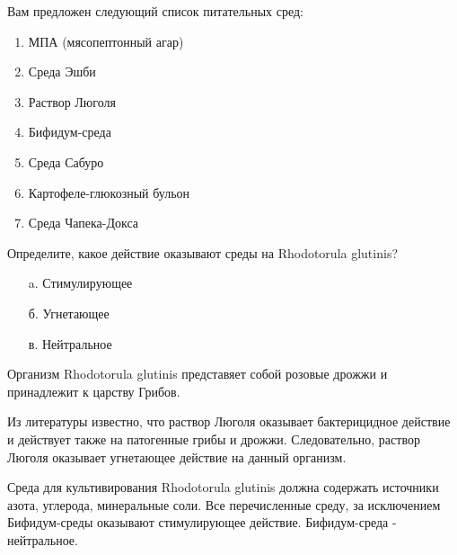 
Вам предложен следующий список питательных сред:

\begin{enumerate}
    \item МПА (мясопептонный агар)
    \item Среда Эшби
    \item Раствор Люголя
    \item Бифидум-среда
    \item Среда Сабуро
    \item Картофеле-глюкозный бульон
    \item Среда Чапека-Докса
\end{enumerate}

Определите, какое действие оказывают среды на  Rhodotorula glutinis?

\begin{enumerate}
    \item[a.] Стимулирующее
    \item[б.] Угнетающее
    \item[в.] Нейтральное
\end{enumerate}

\explanationSection

Организм Rhodotorula glutinis представяет собой розовые дрожжи и принадлежит к царству Грибов. 

Из литературы известно, что раствор Люголя оказывает бактерицидное действие и действует также на патогенные грибы и дрожжи. Следовательно, раствор Люголя оказывает угнетающее действие на данный организм. 

Среда для культивирования Rhodotorula glutinis должна содержать источники азота, углерода, минеральные соли. Все перечисленные среду, за исключением Бифидум-среды оказывают стимулирующее действие. Бифидум-среда - нейтральное.

